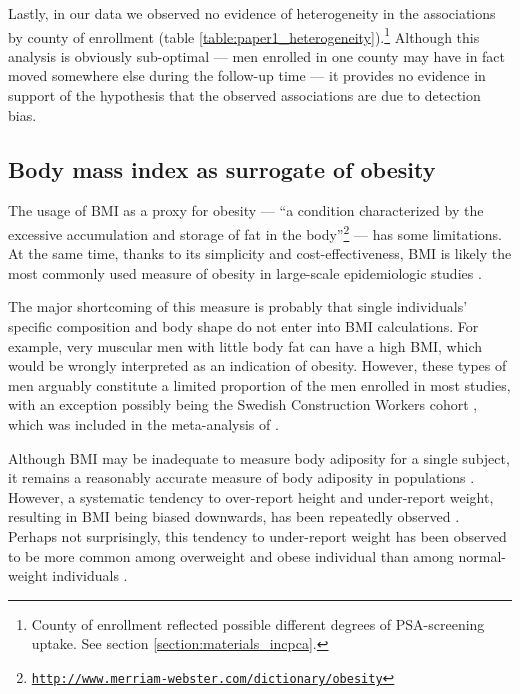 Lastly, in our data we observed no evidence of heterogeneity in the associations by county of enrollment (table \ref{table:paper1_heterogeneity}).\footnote{County of enrollment reflected possible different degrees of PSA-screening uptake. See section \ref{section:materials_incpca}.} Although this analysis is obviously sub-optimal --- men enrolled in one county may have in fact moved somewhere else during the follow-up time --- it provides no evidence in support of the hypothesis that the observed associations are due to detection bias. 

\subsection{Body mass index as surrogate of obesity}

The usage of BMI as a proxy for obesity --- ``a condition characterized by the excessive accumulation and storage of fat in the body''\footnote{\href{http://www.merriam-webster.com/dictionary/obesity}{\texttt{http://www.merriam-webster.com/dictionary/obesity}}} --- has some limitations. At the same time, thanks to its simplicity and cost-effectiveness, BMI is likely the most commonly used measure of obesity in large-scale epidemiologic studies \citep{michels_does_1998}.

The major shortcoming of this measure is probably that single individuals' specific composition and body shape do not enter into BMI calculations. For example, very muscular men with little body fat can have a high BMI, which would be wrongly interpreted as an indication of obesity. However, these types of men arguably constitute  a limited proportion of the men enrolled in most studies, with an exception possibly being the Swedish Construction Workers cohort \citep{stocks_blood_2010}, which was included in the meta-analysis of . 

Although BMI may be inadequate to measure body adiposity for a single subject, it remains a reasonably accurate measure of body adiposity in populations \citep{flegal_comparisons_2009}. However, a systematic tendency to over-report height and under-report weight, resulting in BMI being biased downwards, has been repeatedly observed \citep{connorgorber_comparison_2007}. Perhaps not surprisingly, this tendency to under-report weight has been observed to be more common among overweight and obese individual than among normal-weight individuals \citep{bostrom_socioeconomic_1997, kovalchik_validity_2009}.

